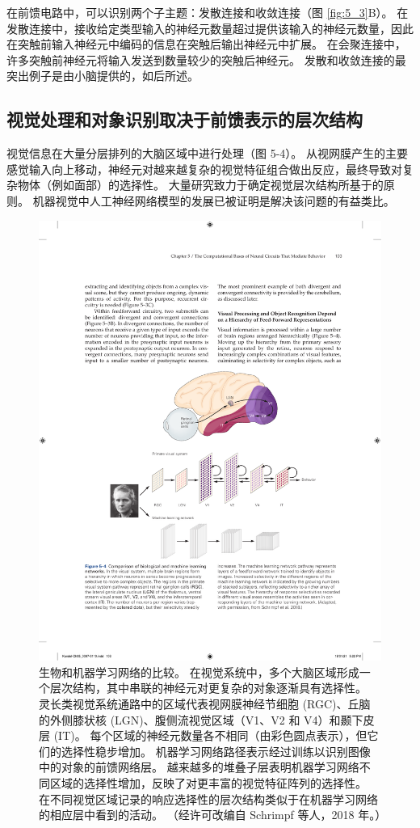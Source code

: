 在前馈电路中，可以识别两个子主题：发散连接和收敛连接（图 \ref{fig:5_3}B）。 
在发散连接中，接收给定类型输入的神经元数量超过提供该输入的神经元数量，因此在突触前输入神经元中编码的信息在突触后输出神经元中扩展。 
在会聚连接中，许多突触前神经元将输入发送到数量较少的突触后神经元。 
发散和收敛连接的最突出例子是由小脑提供的，如后所述。



\subsection{视觉处理和对象识别取决于前馈表示的层次结构}
视觉信息在大量分层排列的大脑区域中进行处理（图 5-4）。 从视网膜产生的主要感觉输入向上移动，神经元对越来越复杂的视觉特征组合做出反应，最终导致对复杂物体（例如面部）的选择性。 大量研究致力于确定视觉层次结构所基于的原则。 机器视觉中人工神经网络模型的发展已被证明是解决该问题的有益类比。

\begin{figure}[htbp]
	\centering
	\includegraphics[width=1.0\linewidth]{chap05/fig_5_4}
	\caption{生物和机器学习网络的比较。 
		在视觉系统中，多个大脑区域形成一个层次结构，其中串联的神经元对更复杂的对象逐渐具有选择性。 
		灵长类视觉系统通路中的区域代表视网膜神经节细胞 (RGC)、丘脑的外侧膝状核 (LGN)、腹侧流视觉区域（V1、V2 和 V4）和颞下皮层 (IT)。
		每个区域的神经元数量各不相同（由彩色圆点表示），但它们的选择性稳步增加。 
		机器学习网络路径表示经过训练以识别图像中的对象的前馈网络层。 
		越来越多的堆叠子层表明机器学习网络不同区域的选择性增加，反映了对更丰富的视觉特征阵列的选择性。 在不同视觉区域记录的响应选择性的层次结构类似于在机器学习网络的相应层中看到的活动。 （经许可改编自 Schrimpf 等人，2018 年。）}
	\label{fig:5_4}
\end{figure}



